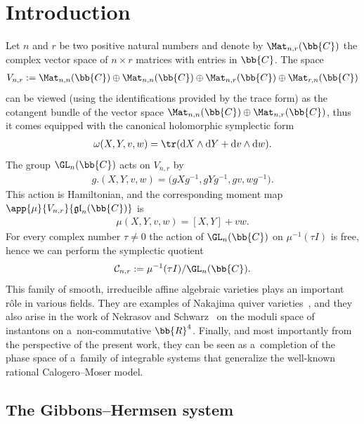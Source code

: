 \section{Introduction}

Let \(n\) and \(r\) be two positive natural numbers and denote by \(\Mat_{n,r}(\bb{C})\) the complex vector
space of \(n\times r\) matrices with entries in \(\bb{C}\).
The space
\begin{gather*}
V_{n,r}\mathrel{:=}\Mat_{n,n}(\bb{C})\oplus\Mat_{n,n}(\bb{C})\oplus\Mat_{n,r}(\bb{C})\oplus\Mat_{r,n}(\bb{C})
\end{gather*}
can be viewed (using the identif\/ications provided by the trace form) as the cotangent bundle of the
vector space \(\Mat_{n,n}(\bb{C})\oplus \Mat_{n,r}(\bb{C})\), thus it comes equipped with the canonical
holomorphic symplectic form
\begin{gather}
\omega(X,Y,v,w)=\tr(\mathrm{d}X\wedge\mathrm{d}Y+\mathrm{d}v\wedge\mathrm{d}w).
\label{eq:ss}
\end{gather}
The group \(\GL_{n}(\bb{C})\) acts on \(V_{n,r}\) by
\begin{gather}
\label{eq:az}
g.(X,Y,v,w)=\big(gXg^{-1},gYg^{-1},gv,wg^{-1}\big).
\end{gather}
This action is Hamiltonian, and the corresponding moment map
\(\app{\mu}{V_{n,r}}{\mathfrak{gl}_{n}(\bb{C})}\) is
\begin{gather}
\label{eq:mom-mu}
\mu(X,Y,v,w)=[X,Y]+vw.
\end{gather}
For every complex number \(\tau\neq 0\) the action of \(\GL_{n}(\bb{C})\) on \(\mu^{-1}(\tau I)\) is free,
hence we can perform the symplectic quotient
\begin{gather}
\label{eq:Cnr}
\mathcal{C}_{n,r}\mathrel{:=}\mu^{-1}(\tau I)/\GL_{n}(\bb{C}).
\end{gather}
This family of smooth, irreducible af\/f\/ine algebraic varieties plays an important r\^ole in various
f\/ields.
They are examples of Nakajima quiver varieties~\cite{naka94}, and they also arise in the work of Nekrasov
and Schwarz~\cite{ns98} on the moduli space of instantons on a~non-commutative \(\bb{R}^{4}\).
Finally, and most importantly from the perspective of the present work, they can be seen as a~completion of
the phase space of a~family of integrable systems that generalize the well-known rational Calogero--Moser
model.

\subsection[The Gibbons-Hermsen system]{The Gibbons--Hermsen system}

